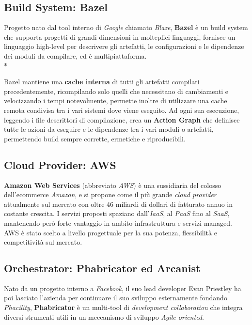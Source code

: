 \documentclass[../main.tex]{subfiles}
\begin{document}
        	\subsection{Build System: Bazel}
        	
        	    Progetto nato dal tool interno di \emph{Google} chiamato \emph{Blaze}, \textbf{Bazel}\cite{bazel} è un build system che supporta progetti di grandi dimensioni in molteplici linguaggi, fornisce un linguaggio high-level per descrivere gli artefatti, le configurazioni e le dipendenze dei moduli da compilare, ed è multipiattaforma.\\*
        	    
        	    Bazel mantiene una \textbf{cache interna} di tutti gli artefatti compilati precedentemente, ricompilando solo quelli che necessitano di cambiamenti e velocizzando i tempi notevolmente, permette inoltre di utilizzare una cache remota condivisa tra i vari sistemi dove viene eseguito. Ad ogni sua esecuzione, leggendo i file descrittori di compilazione, crea un \textbf{Action Graph} che definisce tutte le azioni da eseguire e le dipendenze tra i vari moduli o artefatti, permettendo build sempre corrette, ermetiche e riproducibili.
    	
        	\subsection{Cloud Provider: AWS}
        	
        	    \textbf{Amazon Web Services} (abbreviato \emph{AWS}) è una sussidiaria del colosso dell'ecommerce \emph{Amazon}, e si propone come il più grande \emph{cloud provider} attualmente sul mercato con oltre 46 miliardi di dollari di fatturato annuo in costante crescita. I servizi proposti spaziano dall'\emph{IaaS}, al \emph{PaaS} fino al \emph{SaaS}, mantenendo però forte vantaggio in ambito infrastruttura e servizi managed. AWS è stato scelto a livello progettuale per la sua potenza, flessibilità e competitività sul mercato.
    	
        	\subsection{Orchestrator: Phabricator ed Arcanist}
    	
    	        Nato da un progetto interno a \emph{Facebook}, il suo lead developer Evan Priestley ha poi lasciato l'azienda per continuare il suo sviluppo esternamente fondando \emph{Phacility}, \textbf{Phabricator}\cite{phabricator} è un multi-tool di \emph{development collaboration} che integra diversi strumenti utili in un meccanismo di sviluppo \emph{Agile-oriented}.
    	        
\end{document}
